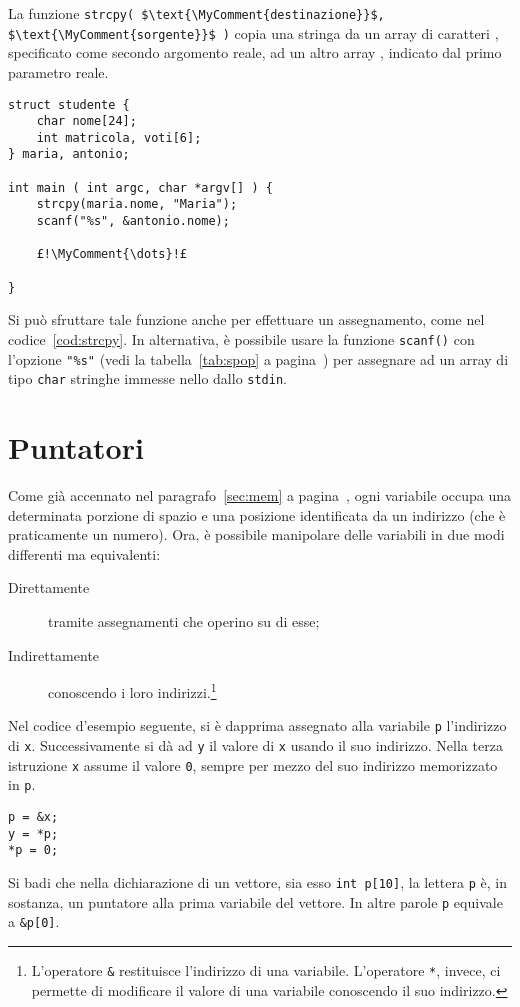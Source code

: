 La funzione \lstinline[mathescape]+strcpy( $\text{\MyComment{destinazione}}$, $\text{\MyComment{sorgente}}$ )+ copia una stringa da un array di caratteri , specificato come secondo argomento reale, ad un altro array , indicato dal primo parametro reale.
\begin{lstlisting}[caption={\em \lstinline!strcpy()! e \lstinline!scanf()!.}, label={cod:strcpy}]
struct studente {
	char nome[24];
	int matricola, voti[6];
} maria, antonio;

int main ( int argc, char *argv[] ) {
	strcpy(maria.nome, "Maria");
	scanf("%s", &antonio.nome);
	
	£!\MyComment{\dots}!£

}
\end{lstlisting}
Si può sfruttare tale funzione anche per effettuare un assegnamento, come nel codice~\ref{cod:strcpy}.
In alternativa, è possibile usare la funzione \lstinline!scanf()! con l'opzione \lstinline!"%s"!
(vedi la tabella~\ref{tab:spop} a pagina~\pageref{tab:spop}) per assegnare ad un array di tipo \lstinline!char! stringhe immesse nello dallo \lstinline!stdin!.



	\section{Puntatori}
	\label{sec:pointers}
Come già accennato nel paragrafo~\ref{sec:mem} a pagina~\pageref{sec:mem}, ogni variabile occupa una determinata porzione di spazio e una posizione identificata da un indirizzo (che è praticamente un numero).
Ora, è possibile manipolare delle variabili in due modi differenti ma equivalenti:
\begin{description}
	\item [Direttamente]
tramite assegnamenti che operino su di esse;
	\item [Indirettamente]
conoscendo i loro indirizzi.\footnote{L'operatore \lstinline!&! restituisce l'indirizzo di una variabile.
L'operatore \lstinline!*!, invece, ci permette di modificare il valore di una variabile conoscendo il suo indirizzo.}
\end{description}
Nel codice d'esempio seguente, si è dapprima assegnato alla variabile \lstinline!p! l'indirizzo di \lstinline!x!.
Successivamente si dà ad \lstinline!y! il valore di \lstinline!x! usando il suo indirizzo.
Nella terza istruzione \lstinline!x! assume il valore \lstinline!0!, sempre per mezzo del suo indirizzo memorizzato in \lstinline!p!.
\begin{lstlisting}
p = &x;
y = *p;
*p = 0;
\end{lstlisting}
Si badi che nella dichiarazione di un vettore, sia esso \lstinline!int p[10]!, la lettera \lstinline!p! è, in sostanza, un puntatore alla prima variabile del vettore.
In altre parole \lstinline!p! equivale a \lstinline!&p[0]!.

